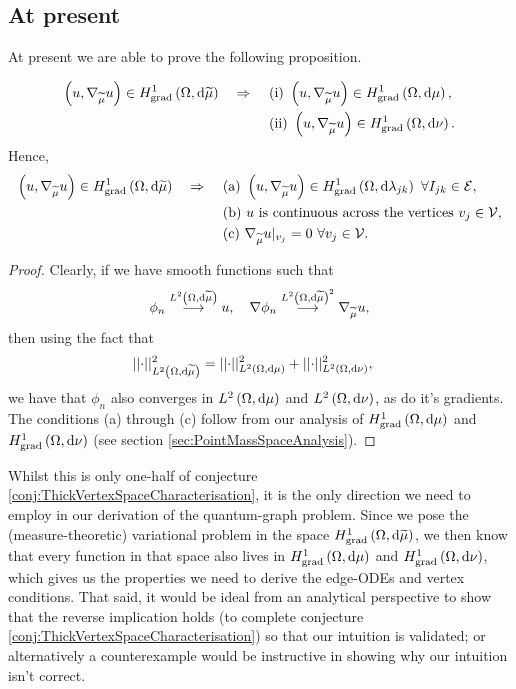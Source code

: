 \subsection{At present}
At present we are able to prove the following proposition.
\begin{prop}
	\begin{align*}
		\left( u, \nabla_{\widetilde{\mu}}u \right)\in H^1_\mathrm{grad}\left( \Omega, \mathrm{d}\widetilde{\mu} \right) \quad\Rightarrow\quad
		& \ \text{(i)} \ \left( u, \nabla_{\widetilde{\mu}}u \right)\in H^1_\mathrm{grad}\left( \Omega, \mathrm{d}\mu \right), \\
		& \ \text{(ii)} \ \left( u, \nabla_{\widetilde{\mu}}u \right)\in H^1_\mathrm{grad}\left( \Omega, \mathrm{d}\nu \right). \\
	\end{align*}
	Hence,
	\begin{align*}
		\left( u, \nabla_{\widetilde{\mu}}u \right)\in H^1_\mathrm{grad}\left( \Omega, \mathrm{d}\widetilde{\mu} \right) \quad\Rightarrow\quad
		& \ \text{(a)} \ \left( u, \nabla_{\widetilde{\mu}}u \right)\in H^1_\mathrm{grad}\left( \Omega, \mathrm{d}\lambda_{jk} \right) \ \forall I_{jk}\in\mathcal{E}, \\
		& \ \text{(b)} \ u \text{ is continuous across the vertices} \ v_j\in\mathcal{V}, \\
		& \ \text{(c)} \ \nabla_{\widetilde{\mu}}u\vert_{v_j} = 0 \ \forall v_j\in\mathcal{V}.
	\end{align*}
\end{prop}
\begin{proof}
	Clearly, if we have smooth functions such that
	\begin{align*}
		\phi_n \overset{L^{2}\left( \Omega,\mathrm{d}\widetilde{\mu} \right)}{\longrightarrow} u, \quad \nabla\phi_n\overset{L^{2}\left( \Omega,\mathrm{d}\widetilde{\mu} \right)^2}{\longrightarrow}\nabla_{\widetilde{\mu}}u,
	\end{align*}
	then using the fact that
	\begin{align*}
		\lvert\lvert \cdot \rvert\rvert_{L^{2}\left( \Omega,\mathrm{d}\widetilde{\mu} \right)}^2 &= \lvert\lvert \cdot \rvert\rvert_{L^{2}\left( \Omega,\mathrm{d}\mu \right)}^2 + \lvert\lvert \cdot \rvert\rvert_{L^{2}\left( \Omega,\mathrm{d}\nu \right)}^2,
	\end{align*}
	we have that $\phi_n$ also converges in $L^{2}\left( \Omega,\mathrm{d}\mu \right)$ and $L^{2}\left( \Omega,\mathrm{d}\nu \right)$, as do it's gradients.	
	The conditions (a) through (c) follow from our analysis of $H^1_\mathrm{grad}\left( \Omega, \mathrm{d}\mu \right)$ and $H^1_\mathrm{grad}\left( \Omega, \mathrm{d}\nu \right)$ (see section \ref{sec:PointMassSpaceAnalysis}).
\end{proof}
Whilst this is only one-half of conjecture \ref{conj:ThickVertexSpaceCharacterisation}, it is the only direction we need to employ in our derivation of the quantum-graph problem.
Since we pose the (measure-theoretic) variational problem in the space $H^1_\mathrm{grad}\left( \Omega, \mathrm{d}\widetilde{\mu} \right)$, we then know that every function in that space also lives in $H^1_\mathrm{grad}\left( \Omega, \mathrm{d}\mu \right)$ and $H^1_\mathrm{grad}\left( \Omega, \mathrm{d}\nu \right)$, which gives us the properties we need to derive the edge-ODEs and vertex conditions.
That said, it would be ideal from an analytical perspective to show that the reverse implication holds (to complete conjecture \ref{conj:ThickVertexSpaceCharacterisation}) so that our intuition is validated; or alternatively a counterexample would be instructive in showing why our intuition isn't correct.

